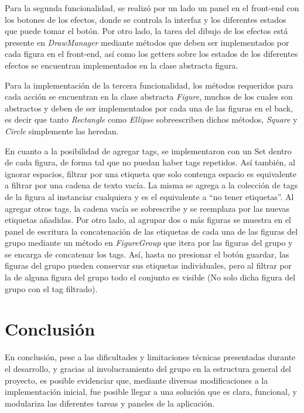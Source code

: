 \documentclass[12pt]{article}
\begin{document}
Para la segunda funcionalidad, se realizó por un lado un panel en el front-end con los botones de los efectos, donde se controla la interfaz y los diferentes estados que puede tomar el botón. Por otro lado, la tarea del dibujo de los efectos está presente en \textit{DrawManager} mediante métodos que deben ser implementados por cada figura en el front-end, así como los getters sobre los estados de los diferentes efectos se encuentran implementados en la clase abstracta figura.

Para la implementación de la tercera funcionalidad, los métodos requeridos para cada acción se encuentran en la clase abstracta \textit{Figure}, muchos de los cuales son abstractos y deben de ser implementados  por cada una de las figuras en el back, es decir que tanto \textit{Rectangle} como \textit{Ellipse} sobreescriben dichos métodos, \textit{Square} y \textit{Circle} simplemente las heredan.

En cuanto a la posibilidad de agregar tags, se implementaron con un Set dentro de cada figura, de forma tal que no puedan haber tags repetidos. Así también, al ignorar espacios, filtrar por una etiqueta que solo contenga espacio es equivalente a filtrar por una cadena de texto vacía. La misma se agrega a la colección de tags de la figura al instanciar cualquiera y es el equivalente a “no tener etiquetas”. Al agregar otros tags, la cadena vacía se sobrescribe y se reemplaza por las nuevas etiquetas añadidas. Por otro lado, al agrupar dos o más figuras se muestra en el panel de escritura la concatenación de las etiquetas de cada una de las figuras del grupo mediante un método en \textit{FigureGroup} que itera por las figuras del grupo y se encarga de concatenar los tags. Así, hasta no presionar el botón guardar, las figuras del grupo pueden conservar sus etiquetas individuales, pero al filtrar por la de alguna figura del grupo todo el conjunto es visible (No solo dicha figura del grupo con el tag filtrado).

\section* {Conclusión}

En conclusión, pese a las dificultades y limitaciones técnicas presentadas durante el desarrollo, y gracias al involucramiento del grupo en la estructura general del proyecto, es posible evidenciar que, mediante diversas modificaciones a la implementación inicial, fue posible llegar a una solución que es clara, funcional, y modulariza las diferentes tareas y paneles de la aplicación.
\end{document}
